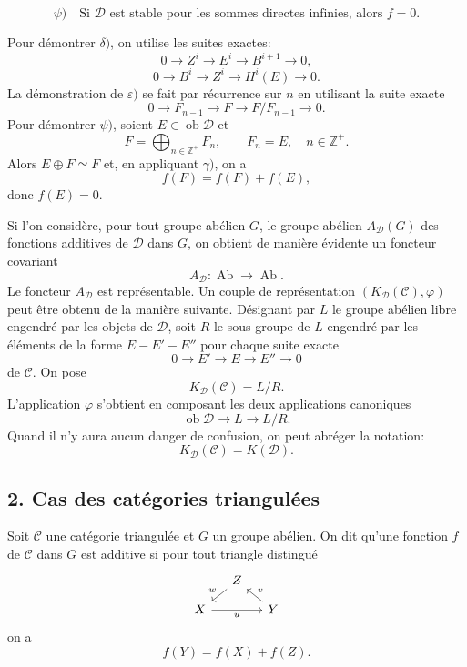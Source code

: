 \documentclass[11pt]{article}
\providecommand{\Ob}{\operatorname{ob}}
\providecommand{\cC}{\mathcal C}
\providecommand{\Ob}{\operatorname{ob}}
\providecommand{\Ab}{\operatorname{Ab}}
\providecommand{\cC}{\mathcal C}
\providecommand{\cD}{\mathcal D}
\providecommand{\Ab}{\operatorname{Ab}}
\providecommand{\Ob}{\operatorname{Ob}}
\begin{document}
\[
\psi)\quad
\text{Si }\cD\text{ est stable pour les sommes directes infinies, alors }f=0.
\]

Pour démontrer $\delta)$, on utilise les suites exactes:
\[
0\longrightarrow Z^i\longrightarrow E^i\longrightarrow B^{i+1}\longrightarrow 0,
\]
\[
0\longrightarrow B^i\longrightarrow Z^i\longrightarrow H^i(E)\longrightarrow 0.
\]
La démonstration de $\varepsilon)$ se fait par récurrence sur $n$ en utilisant la suite exacte
\[
0\longrightarrow F_{n-1}\longrightarrow F\longrightarrow F/F_{n-1}\longrightarrow 0.
\]
Pour démontrer $\psi)$, soient $E\in\Ob\cD$ et
\[
F=\bigoplus_{n\in\mathbb Z^+}F_n,\qquad F_n=E,\quad n\in\mathbb Z^+.
\]
Alors $E\oplus F\simeq F$ et, en appliquant $\gamma)$, on a
\[
f(F)=f(F)+f(E),
\]
donc $f(E)=0$.

Si l'on considère, pour tout groupe abélien $G$, le groupe abélien $A_{\cD}(G)$ des fonctions additives de $\cD$ dans $G$, on obtient de manière évidente un foncteur covariant
\[
A_{\cD}:\Ab\longrightarrow\Ab.
\]
Le foncteur $A_{\cD}$ est représentable. Un couple de représentation $(K_{\cD}(\cC),\varphi)$ peut être obtenu de la manière suivante. Désignant par $L$ le groupe abélien libre engendré par les objets de $\cD$, soit $R$ le sous-groupe de $L$ engendré par les éléments de la forme $E-E'-E''$ pour chaque suite exacte
\[
0\longrightarrow E'\longrightarrow E\longrightarrow E''\longrightarrow 0
\]
de $\cC$. On pose
\[
K_{\cD}(\cC)=L/R.
\]
L'application $\varphi$ s'obtient en composant les deux applications canoniques
\[
\Ob\cD\longrightarrow L\longrightarrow L/R.
\]
Quand il n'y aura aucun danger de confusion, on peut abréger la notation:
\[
K_{\cD}(\cC)=K(\cD).
\]

\subsection*{2. Cas des catégories triangulées}

Soit $\cC$ une catégorie triangulée et $G$ un groupe abélien. On dit qu'une fonction $f$ de $\cC$ dans $G$ est additive si pour tout triangle distingué
\[
\begin{tikzcd}[column sep=small,row sep=small]
& Z \arrow[dl,"w"']\\
X \arrow[rr,"u"'] && Y \arrow[ul,"v"']
\end{tikzcd}
\]
on a
\[
f(Y)=f(X)+f(Z).
\]
\end{document}
